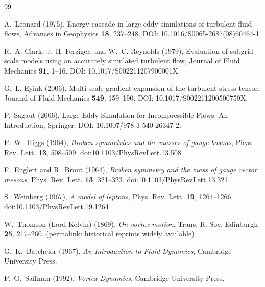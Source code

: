 \documentclass[11pt]{article}
\theoremstyle{definition}
\theoremstyle{plain}
\theoremstyle{remark}
\begin{document}
        \begin{thebibliography}{99}

            A.~Leonard (1975),
            Energy cascade in large-eddy simulations of turbulent fluid flows,
            Advances in Geophysics \textbf{18}, 237–248.
            DOI: 10.1016/S0065-2687(08)60464-1.

            R.~A. Clark, J.~H. Ferziger, and W.~C. Reynolds (1979),
            Evaluation of subgrid-scale models using an accurately simulated turbulent flow,
            Journal of Fluid Mechanics \textbf{91}, 1–16.
            DOI: 10.1017/S002211207900001X.

            G.~L. Eyink (2006),
            Multi-scale gradient expansion of the turbulent stress tensor,
            Journal of Fluid Mechanics \textbf{549}, 159–190.
            DOI: 10.1017/S002211200500759X.

            P.~Sagaut (2006),
            Large Eddy Simulation for Incompressible Flows: An Introduction,
            Springer.
            DOI: 10.1007/978-3-540-26347-2.


            P.~W.~Higgs (1964),
            \emph{Broken symmetries and the masses of gauge bosons},
            Phys. Rev. Lett. \textbf{13}, 508--509.
            doi:10.1103/PhysRevLett.13.508

            F.~Englert and R.~Brout (1964),
            \emph{Broken symmetry and the mass of gauge vector mesons},
            Phys. Rev. Lett. \textbf{13}, 321--323.
            doi:10.1103/PhysRevLett.13.321

            S.~Weinberg (1967),
            \emph{A model of leptons},
            Phys. Rev. Lett. \textbf{19}, 1264--1266.
            doi:10.1103/PhysRevLett.19.1264

            W.~Thomson (Lord Kelvin) (1869),
            \emph{On vortex motion},
            Trans. R. Soc. Edinburgh \textbf{25}, 217--260.
            (permalink: historical reprints widely available)

            G.~K.~Batchelor (1967),
            \emph{An Introduction to Fluid Dynamics},
            Cambridge University Press.

            P.~G.~Saffman (1992),
            \emph{Vortex Dynamics},
            Cambridge University Press.


\end{thebibliography}
\end{document}
